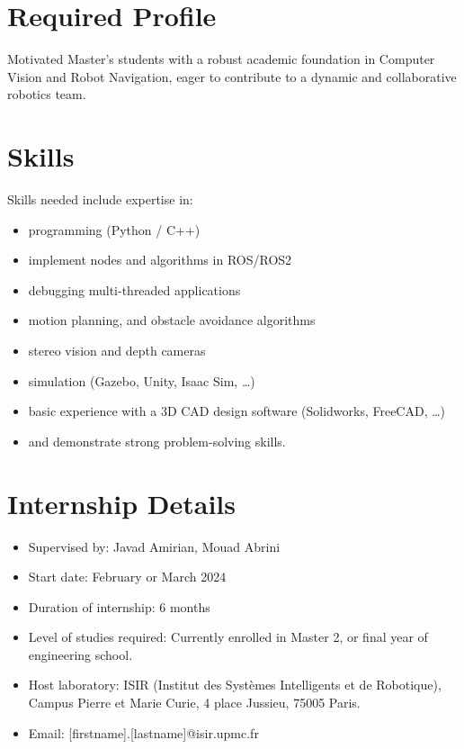 \documentclass[11pt]{article}
\begin{document}

\section{Required Profile}
Motivated Master's students with a robust academic foundation in Computer Vision and Robot Navigation, eager to contribute to a dynamic and collaborative robotics team.

\section{Skills}
Skills needed include expertise in:

\begin{itemize}
    \item programming (Python / C++)
    \item implement nodes and algorithms in ROS/ROS2
    \item debugging multi-threaded applications
    \item motion planning, and obstacle avoidance algorithms
    \item stereo vision and depth cameras
    \item simulation (Gazebo, Unity, Isaac Sim, …)
    \item basic experience with a 3D CAD design software (Solidworks, FreeCAD, …)
    \item and demonstrate strong problem-solving skills.
\end{itemize}


\section{Internship Details}
\begin{itemize}
    \item Supervised by: Javad Amirian, Mouad Abrini
    \item Start date: February or March 2024
    \item Duration of internship: 6 months
    \item Level of studies required: Currently enrolled in Master 2, or final year of engineering school.
    \item Host laboratory: ISIR (Institut des Systèmes Intelligents et de Robotique), Campus Pierre et Marie Curie, 4 place Jussieu, 75005 Paris.
    \item Email: [firstname].[lastname]@isir.upmc.fr
\end{itemize}
\end{document}
